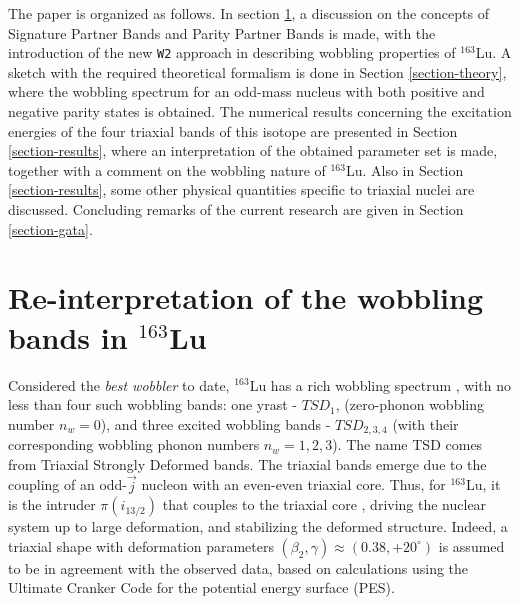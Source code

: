 \documentclass[myclassdoc,debug]{rjparticle}
\begin{document}
The paper is organized as follows. In section \ref{section-reinterpretation}, a discussion on the concepts of Signature Partner Bands and Parity Partner Bands is made, with the introduction of the new \texttt{W2} approach in describing wobbling properties of $^{163}$Lu. A sketch with the required theoretical formalism is done in Section \ref{section-theory}, where the wobbling spectrum for an odd-mass nucleus with both positive and negative parity states is obtained. The numerical results concerning the excitation energies of the four triaxial bands of this isotope are presented in Section \ref{section-results}, where an interpretation of the obtained parameter set is made, together with a comment on the wobbling nature of $^{163}$Lu. Also in Section \ref{section-results}, some other physical quantities specific to triaxial nuclei are discussed. Concluding remarks of the current research are given in Section \ref{section-gata}.

\section{\texorpdfstring{Re-interpretation of the wobbling bands in $^{163}$Lu}%
                               {Re-interpretation of the wobbling bands structure for 163Lu}}
\label{section-reinterpretation}
Considered the \emph{best wobbler} to date, $^{163}$Lu has a rich wobbling spectrum \cite{odegaard2001evidence,jensen2002evidence}, with no less than four such wobbling bands: one yrast - $TSD_1$, (zero-phonon wobbling number $n_w=0$), and three excited wobbling bands - $TSD_{2,3,4}$ (with their corresponding wobbling phonon numbers $n_w=1,2,3$). The name TSD comes from Triaxial Strongly Deformed bands. The triaxial bands emerge due to the coupling of an odd-$\vec{j}$ nucleon with an even-even triaxial core. Thus, for $^{163}$Lu, it is the intruder $\pi(i_{13/2})$ that couples to the triaxial core \cite{odegaard2001evidence,hamamoto2002wobbling,jensen2002wobbling}, driving the nuclear system up to large deformation, and stabilizing the deformed structure. Indeed, a triaxial shape with deformation parameters \cite{bohr1998nuclear} $(\beta_2,\gamma)\approx(0.38,+20^\circ)$ is assumed to be in agreement with the observed data, based on calculations using the Ultimate Cranker Code \cite{bengtsson1990high} for the potential energy surface (PES).
\end{document}
